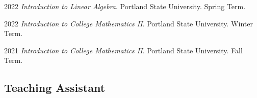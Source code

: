 \documentclass[12pt,letterpaper]{report}
\begin{document}
    \begin{tablist}

        \item[2022] \tab \emph{Introduction to Linear Algebra}. Portland State University. Spring Term.

        \item[2022] \tab \emph{Introduction to College Mathematics II}. Portland State University. Winter Term.

        \item[2021] \tab \emph{Introduction to College Mathematics II}. Portland State University. Fall Term. 
    
    \end{tablist}

    \subsection*{Teaching Assistant}
\end{document}
